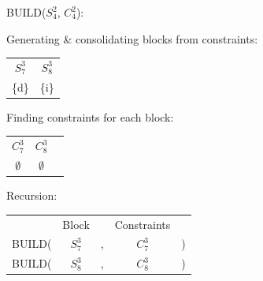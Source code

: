 \documentclass[11pt]{article} %
\begin{document}
	\hspace{0.5cm}BUILD($S_4^2$, $C_4^2$):
		\begin{center}
		Generating \& consolidating blocks from constraints:
		
		\begin{tabular}{c c}
			\hspace{0.8cm}$S_7^3$\hspace{0.8cm} & \hspace{0.8cm}$S_8^3$\hspace{0.8cm} \\
			\{d\} & \{i\}
		\end{tabular}
	
		Finding constraints for each block:
		
		\begin{tabular}{c c c}
			\hspace{0.8cm}$C_7^3$\hspace{0.8cm} & \hspace{0.8cm}$C_8^3$\hspace{0.8cm} \\
			$\emptyset$ & $\emptyset$
		\end{tabular}

		Recursion:
		
		\begin{tabular}{c c c c c}
			 & Block & & Constraints & \\
			BUILD( & $S_7^3$ & , & $C_7^3$ & ) \\
			BUILD( & $S_8^3$ & , & $C_8^3$ & )
		\end{tabular}
		\end{center}
\end{document}
